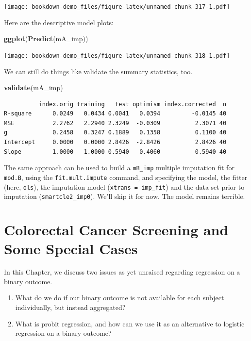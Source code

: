 \documentclass[]{book}
\newenvironment{Shaded}{\begin{snugshade}}{\end{snugshade}}
\newcommand{\KeywordTok}[1]{\textcolor[rgb]{0.13,0.29,0.53}{\textbf{#1}}}
\newcommand{\NormalTok}[1]{#1}
\theoremstyle{definition}
\theoremstyle{definition}
\theoremstyle{definition}
\theoremstyle{remark}
\begin{document}
\texttt{[image: bookdown-demo\_files/figure-latex/unnamed-chunk-317-1.pdf]}

Here are the descriptive model plots:

\begin{Shaded}
\begin{Highlighting}[]
\KeywordTok{ggplot}\NormalTok{(}\KeywordTok{Predict}\NormalTok{(mA_imp))}
\end{Highlighting}
\end{Shaded}

\texttt{[image: bookdown-demo\_files/figure-latex/unnamed-chunk-318-1.pdf]}

We can still do things like validate the summary statistics, too.

\begin{Shaded}
\begin{Highlighting}[]
\KeywordTok{validate}\NormalTok{(mA_imp)}
\end{Highlighting}
\end{Shaded}

\begin{verbatim}
          index.orig training   test optimism index.corrected  n
R-square      0.0249   0.0434 0.0041   0.0394         -0.0145 40
MSE           2.2762   2.2940 2.3249  -0.0309          2.3071 40
g             0.2458   0.3247 0.1889   0.1358          0.1100 40
Intercept     0.0000   0.0000 2.8426  -2.8426          2.8426 40
Slope         1.0000   1.0000 0.5940   0.4060          0.5940 40
\end{verbatim}

The same approach can be used to build a \texttt{mB\_imp} multiple
imputation fit for \texttt{mod.B}, using the \texttt{fit.mult.impute}
command, and specifying the model, the fitter (here, \texttt{ols}), the
imputation model (\texttt{xtrans\ =\ imp\_fit}) and the data set prior
to imputation (\texttt{smartcle2\_imp0}). We'll skip it for now. The
model remains terrible.

\chapter{Colorectal Cancer Screening and Some Special
Cases}\label{colorectal-cancer-screening-and-some-special-cases}

In this Chapter, we discuss two issues as yet unraised regarding
regression on a binary outcome.

\begin{enumerate}
\def\labelenumi{\arabic{enumi}.}
\item
  What do we do if our binary outcome is not available for each subject
  individually, but instead aggregated?
\item
  What is probit regression, and how can we use it as an alternative to
  logistic regression on a binary outcome?
\end{enumerate}
\end{document}
